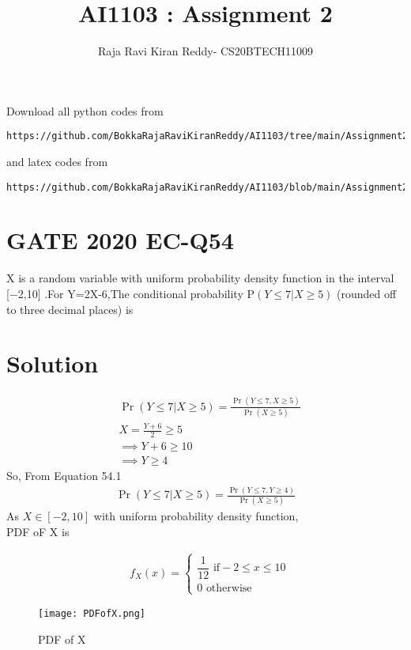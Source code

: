 \documentclass[journal,12pt,twocolumn]{IEEEtran}
\begin{document}
\let\vec\mathbf
\renewcommand{\thefigure}{\theproblem}
\def\putbox#1#2#3{\makebox[0in][l]{\makebox[#1][l]{}\raisebox{\baselineskip}[0in][0in]{\raisebox{#2}[0in][0in]{#3}}}}
     \def\rightbox#1{\makebox[0in][r]{#1}}
     \def\centbox#1{\makebox[0in]{#1}}
     \def\topbox#1{\raisebox{-\baselineskip}[0in][0in]{#1}}
     \def\midbox#1{\raisebox{-0.5\baselineskip}[0in][0in]{#1}}
\vspace{3cm}
\title{AI1103 : Assignment 2}
\author{Raja Ravi Kiran Reddy- CS20BTECH11009}
\maketitle
\newpage
\bigskip
\renewcommand{\thefigure}{\arabic{figure}}
\renewcommand{\thetable}{\arabic{table}}
Download all python codes from 
\begin{lstlisting}
https://github.com/BokkaRajaRaviKiranReddy/AI1103/tree/main/Assignment2/codes
\end{lstlisting}
%
and latex codes from 
%
\begin{lstlisting}
https://github.com/BokkaRajaRaviKiranReddy/AI1103/blob/main/Assignment2/Assignment2.tex
\end{lstlisting}
\section*{GATE 2020 EC-Q54}
X is a random variable with uniform probability density function in the interval
 [−2,10] .For Y=2X-6,The conditional probability P$(Y\leq7|X\geq5)$
(rounded off to three decimal places) is 
\section*{Solution}
\begin{align*}
\tag{54.1}
  &\Pr(Y\leq7|X\geq5)=\frac{\Pr(Y\leq7,X\geq5)}{\Pr(X\geq5)}\\
  &X=\frac{Y+6}{2}\geq5\\
  &\implies Y+6\geq10\\
  &\implies Y\geq4
\end{align*}
So,  From Equation 54.1
\begin{align}
   \tag{54.2}
   \Pr(Y\leq7|X\geq5)=\frac{\Pr(Y\leq7,Y\geq4)}{\Pr(X\geq5)}
\end{align}
As $X\in [-2,10]$ with uniform probability density function,\\
PDF oF X is

\begin{align}
\tag{54.3}
 &f_X(x)=\begin{cases}
  \dfrac{1}{12}  \text{  if} -2\leq x \leq10\\
    0 \text{  otherwise}
  \end{cases}
\end{align}
\begin{figure}[h]
    \centering
    \texttt{[image: PDFofX.png]}
    \caption{PDF of X}
    \label{fig:my_label}
\end{figure}
\end{document}

